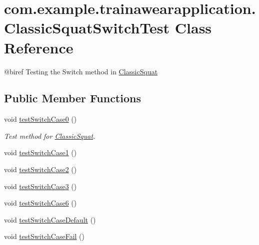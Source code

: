 \hypertarget{classcom_1_1example_1_1trainawearapplication_1_1_classic_squat_switch_test}{}\section{com.\+example.\+trainawearapplication.\+Classic\+Squat\+Switch\+Test Class Reference}
\label{classcom_1_1example_1_1trainawearapplication_1_1_classic_squat_switch_test}


@biref Testing the Switch method in \mbox{\hyperlink{classcom_1_1example_1_1trainawearapplication_1_1_classic_squat}{Classic\+Squat}}  


\subsection*{Public Member Functions}
\begin{DoxyCompactItemize}
\item 
void \mbox{\hyperlink{classcom_1_1example_1_1trainawearapplication_1_1_classic_squat_switch_test_adca8046d4e95d7ca68bbc42ad0cf5d49}{test\+Switch\+Case0}} ()
\begin{DoxyCompactList}\small\item\em Test method for \mbox{\hyperlink{classcom_1_1example_1_1trainawearapplication_1_1_classic_squat}{Classic\+Squat}}. \end{DoxyCompactList}\item 
void \mbox{\hyperlink{classcom_1_1example_1_1trainawearapplication_1_1_classic_squat_switch_test_a8921734ff16a8ee1db468bbe571aaeef}{test\+Switch\+Case1}} ()
\item 
void \mbox{\hyperlink{classcom_1_1example_1_1trainawearapplication_1_1_classic_squat_switch_test_a14b7eb13809009e9175946b1bdcf3d46}{test\+Switch\+Case2}} ()
\item 
void \mbox{\hyperlink{classcom_1_1example_1_1trainawearapplication_1_1_classic_squat_switch_test_a2823f330df1b584569d8ab4b90e9634e}{test\+Switch\+Case3}} ()
\item 
void \mbox{\hyperlink{classcom_1_1example_1_1trainawearapplication_1_1_classic_squat_switch_test_a674df333a8d1b14d893d921e1e3be281}{test\+Switch\+Case6}} ()
\item 
void \mbox{\hyperlink{classcom_1_1example_1_1trainawearapplication_1_1_classic_squat_switch_test_af3378ca920eb59a2c102f85e3627084c}{test\+Switch\+Case\+Default}} ()
\item 
void \mbox{\hyperlink{classcom_1_1example_1_1trainawearapplication_1_1_classic_squat_switch_test_aade7e343e9d5050a6ce3142f756650e9}{test\+Switch\+Case\+Fail}} ()
\end{DoxyCompactItemize}
